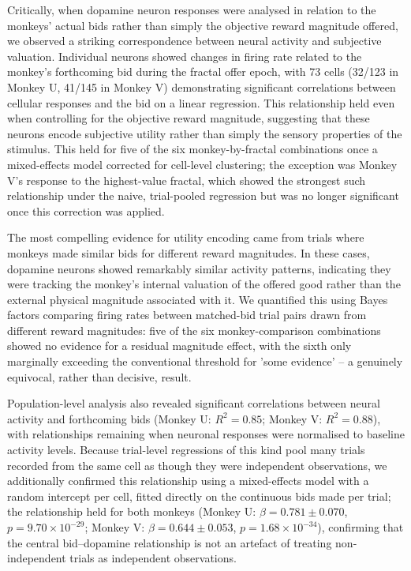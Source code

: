 Critically, when dopamine neuron responses were analysed in relation to the monkeys' actual bids rather than simply the objective reward magnitude offered, we observed a striking correspondence between neural activity and subjective valuation. Individual neurons showed changes in firing rate related to the monkey's forthcoming bid during the fractal offer epoch, with 73 cells (32/123 in Monkey U, 41/145 in Monkey V) demonstrating significant correlations between cellular responses and the bid on a linear regression. This relationship held even when controlling for the objective reward magnitude, suggesting that these neurons encode subjective utility rather than simply the sensory properties of the stimulus. This held for five of the six monkey-by-fractal combinations once a mixed-effects model corrected for cell-level clustering; the exception was Monkey V's response to the highest-value fractal, which showed the strongest such relationship under the naive, trial-pooled regression but was no longer significant once this correction was applied.

The most compelling evidence for utility encoding came from trials where monkeys made similar bids for different reward magnitudes. In these cases, dopamine neurons showed remarkably similar activity patterns, indicating they were tracking the monkey's internal valuation of the offered good rather than the external physical magnitude associated with it. We quantified this using Bayes factors comparing firing rates between matched-bid trial pairs drawn from different reward magnitudes: five of the six monkey-comparison combinations showed no evidence for a residual magnitude effect, with the sixth only marginally exceeding the conventional threshold for 'some evidence' -- a genuinely equivocal, rather than decisive, result.

Population-level analysis also revealed significant correlations between neural activity and forthcoming bids (Monkey U: $R^2 = 0.85$; Monkey V: $R^2 = 0.88$), with relationships remaining when neuronal responses were normalised to baseline activity levels. Because trial-level regressions of this kind pool many trials recorded from the same cell as though they were independent observations, we additionally confirmed this relationship using a mixed-effects model with a random intercept per cell, fitted directly on the continuous bids made per trial; the relationship held for both monkeys (Monkey U: $\beta = 0.781 \pm 0.070$, $p = 9.70 \times 10^{-29}$; Monkey V: $\beta = 0.644 \pm 0.053$, $p = 1.68 \times 10^{-34}$), confirming that the central bid–dopamine relationship is not an artefact of treating non-independent trials as independent observations.

